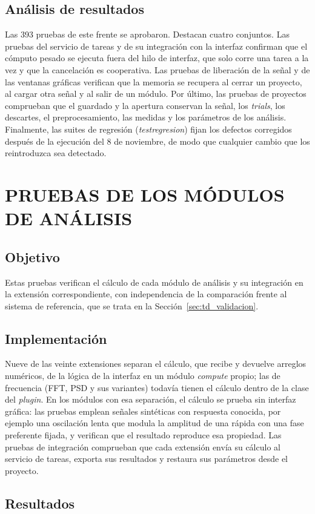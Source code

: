 \documentclass[12pt,letterpaper,oneside]{article}
\DeclareRobustCommand{\_}{\textunderscore\allowbreak}
\newcommand{\capitulo}[1]{\clearpage\section{#1}}
\begin{document}
\subsection{Análisis de resultados}
Las 393 pruebas de este frente se aprobaron. Destacan cuatro conjuntos. Las pruebas del servicio de tareas y de su integración con la interfaz confirman que el cómputo pesado se ejecuta fuera del hilo de interfaz, que solo corre una tarea a la vez y que la cancelación es cooperativa. Las pruebas de liberación de la señal y de las ventanas gráficas verifican que la memoria se recupera al cerrar un proyecto, al cargar otra señal y al salir de un módulo. Por último, las pruebas de proyectos comprueban que el guardado y la apertura conservan la señal, los \textit{trials}, los descartes, el preprocesamiento, las medidas y los parámetros de los análisis. Finalmente, las suites de regresión (\textit{test\_regresion\_*}) fijan los defectos corregidos después de la ejecución del 8 de noviembre, de modo que cualquier cambio que los reintroduzca sea detectado.
\capitulo{PRUEBAS DE LOS MÓDULOS DE ANÁLISIS}
\label{sec:td_modulos}

\subsection{Objetivo}
Estas pruebas verifican el cálculo de cada módulo de análisis y su integración en la extensión correspondiente, con independencia de la comparación frente al sistema de referencia, que se trata en la Sección~\ref{sec:td_validacion}.

\subsection{Implementación}
Nueve de las veinte extensiones separan el cálculo, que recibe y devuelve arreglos numéricos, de la lógica de la interfaz en un módulo \textit{compute} propio; las de frecuencia (FFT, PSD y sus variantes) todavía tienen el cálculo dentro de la clase del \textit{plugin}. En los módulos con esa separación, el cálculo se prueba sin interfaz gráfica: las pruebas emplean señales sintéticas con respuesta conocida, por ejemplo una oscilación lenta que modula la amplitud de una rápida con una fase preferente fijada, y verifican que el resultado reproduce esa propiedad. Las pruebas de integración comprueban que cada extensión envía su cálculo al servicio de tareas, exporta sus resultados y restaura sus parámetros desde el proyecto.

\subsection{Resultados}
\end{document}
